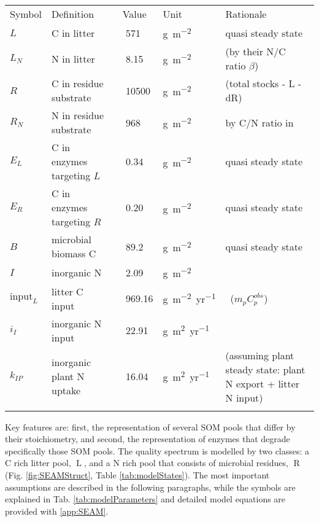 \begin{table*}[t]
\caption{
\label{tab:modelStates}
State variables and model inputs with initial values and input fluxes. Values
refer to the Laqueuille pasture calibration. }
\begin{tabular}{lp{4cm}lllp{5.5cm}}
\tophline
Symbol &  Definition & \multicolumn{2}{c}{Value} & Unit & Rationale \\
\middlehline
$L$ &  C in litter & & 571 & \unit{g~m^{-2}} & quasi steady state 
\\
$L_N$ &  N in litter & & 8.15 & \unit{g~m^{-2}} & \citep{Perveen14}
(by their N/C ratio $\beta$)
\\
$R$ &  C in residue substrate & & 10500 & \unit{g~m^{-2}} &
\citep{Allard07} (total stocks - L - dR)
\\
$R_N$ &  N in residue substrate & & 968 & \unit{g~m^{-2}} & by C/N
ratio in \citep{Perveen14} \\
$E_L$ &  C in enzymes targeting $L$ & & 0.34 & \unit{g~m^{-2}} & 
quasi steady state \\
$E_R$ &  C in enzymes targeting $R$ & & 0.20 & \unit{g~m^{-2}} & 
quasi steady state \\
$B$ & microbial biomass C & & 89.2 & \unit{g~m^{-2}} &  quasi steady
state \\
$I$ & inorganic N & & 2.09 & \unit{g~m^{-2}} & \citep{Perveen14} \\
\middlehline
$\mathrm{input}_{L}$ & litter C input & & 969.16 &
\unit{g~m^{-2}yr^{-1}} & \citep{Perveen14} \, ($m_p C^{obs}_p$)\\
$i_{I}$ & inorganic N input & & 22.91 & \unit{g~m^2yr^{-1}} 
& \citep{Perveen14} \\
$k_{IP}$ & inorganic plant N uptake & & 16.04 & 
\unit{g~m^2yr^{-1}} & \citep{Perveen14} (assuming plant
steady state: plant N export + litter N input)\\
\bottomhline
\end{tabular}
\end{table*}

Key features are: first, the representation of several SOM pools that differ by
their stoichiometry, and second, the representation of enzymes that degrade
specifically those SOM pools. The quality spectrum is modelled by two classes:
a C rich litter pool, $\operatorname{L}$, and a N rich pool that consists of
microbial residues, $\operatorname{R}$ (Fig. \ref{fig:SEAMStruct}, Table
\ref{tab:modelStates}). The most important assumptions are described in the
following paragraphs, while the symbols are explained in Tab.
\ref{tab:modelParameters} and detailed model equations are provided with
\ref{app:SEAM}.

